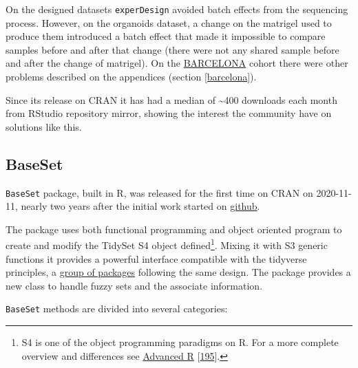 \documentclass[
  12pt,
  a4paper,
  twoside,
  openright]{book}
\begin{document}
On the designed datasets \texttt{experDesign} avoided batch effects from the sequencing process.
However, on the organoids dataset, a change on the matrigel used to produce them introduced a batch effect that made it impossible to compare samples before and after that change (there were not any shared sample before and after the change of matrigel).
On the \protect\hyperlink{acronyms_BARCELONA}{BARCELONA} cohort there were other problems described on the appendices (section \ref{barcelona}).

Since its release on CRAN it has had a median of \textasciitilde400 downloads each month from RStudio repository mirror, showing the interest the community have on solutions like this.

\FloatBarrier

\hypertarget{baseset-1}{%
\subsection{BaseSet}\label{baseset-1}}

\texttt{BaseSet} package, built in R, was released for the first time on CRAN on 2020-11-11, nearly two years after the initial work started on \href{https://github.com/llrs/BaseSet}{github}.

The package uses both functional programming and object oriented program to create and modify the TidySet S4 object defined\footnote{S4 is one of the object programming paradigms on R.
  For a more complete overview and differences see \href{https://adv-r.hadley.nz/oo.html}{Advanced R} {[}\protect\hyperlink{ref-wickham2019}{195}{]}.}.
Mixing it with S3 generic functions it provides a powerful interface compatible with the tidyverse principles, a \href{https://www.tidyverse.org/}{group of packages} following the same design.
The package provides a new class to handle fuzzy sets and the associate information.

\texttt{BaseSet} methods are divided into several categories:
\end{document}
